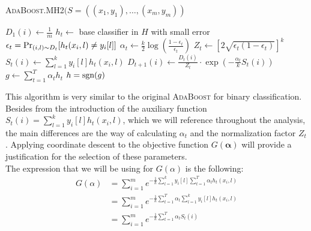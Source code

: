 \documentclass{article}
\begin{document}
\textsc{AdaBoost.MH2}$(S = ((x_1,y_1),\ldots,(x_m,y_m))$
\begin{algorithmic}[1]
    \State $D_1(i) \gets \frac{1}{m}$
\EndFor
{}
    \State $h_t \gets$ base classifier in $H$ with small error $\epsilon_t=\textnormal{Pr}_{(i,l)\sim D_t}[h_t(x_i,l)\neq y_i[l]]$
    \State $\alpha_t \gets \frac{k}{2}\log\left(\frac{1-\epsilon_t}{\epsilon_t}\right)$
    \State $Z_t \gets \left[2\sqrt{\epsilon_t(1-\epsilon_t)}\right]^k$
        \State $S_t(i) \gets \sum_{l=1}^k y_i[l]h_t(x_i,l)$
        \State $D_{t+1}(i) \gets \frac{D_t(i)}{Z_t}\cdot \exp\left(-\frac{\alpha_t}{k}S_t(i)\right)$
    \EndFor
\EndFor
\State $g \gets \sum_{t=1}^T \alpha_t h_t$
\State \Return $h = \textnormal{sgn}(g)$
\end{algorithmic}

This algorithm is very similar to the original \textsc{AdaBoost} for binary classification. Besides from the introduction of the auxiliary function $S_t(i) = \sum_{l=1}^k y_i[l]h_t(x_i,l)$, which we will reference throughout the analysis, the main differences are the way of calculating $\alpha_t$ and the normalization factor $Z_t$. Applying coordinate descent to the objective function $G(\boldsymbol{\alpha})$ will provide a justification for the selection of these parameters.\\
The expression that we will be using for $G(\alpha)$ is the following:
\begin{align*}
    G(\alpha)&= \sum_{i=1}^m e^{-\frac{1}{k} \sum_{l=1}^k y_i[l]\sum_{t=1}^T \alpha_t h_t(x_i,l)}\\
    &= \sum_{i=1}^m e^{-\frac{1}{k} \sum_{t=1}^T \alpha_t \sum_{l=1}^k y_i[l] h_t(x_i,l)}\\
    &= \sum_{i=1}^m e^{-\frac{1}{k} \sum_{t=1}^T \alpha_t S_t(i)}\\
\end{align*}
\end{document}
